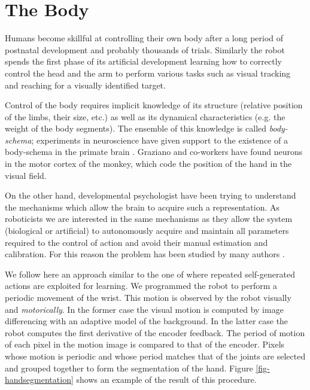 \section{The Body}
\label{sect:body}

Humans become skillful at controlling their own body after a long period of postnatal development and probably thousands of trials. Similarly the robot spends the first phase of its artificial development learning how to correctly control the head and the arm to perform various tasks such as visual tracking and reaching for a visually identified target.

Control of the body requires implicit knowledge of its structure (relative position of the limbs, their size, etc.) as well as its dynamical characteristics (e.g. the weight of the body segments). The ensemble of this knowledge is called \emph{body-schema}; experiments in neuroscience have given support to the existence of a body-schema in the primate brain \cite{graziano99whereis,graziano00coding}. Graziano and co-workers have found neurons in the motor cortex of the monkey, which code the position of the hand in the visual field.

On the other hand, developmental psychologist have been trying to understand the mechanisms which allow the brain to acquire such a representation. As roboticists we are interested in the same mechanisms as they allow the system (biological or artificial) to autonomously acquire and maintain all parameters required to the control of action and avoid their manual estimation and calibration. For this reason the problem has been studied by many authors \cite{yoshikawa03doestheinvariance,fitzpatrick04feelthebeat,metta03early}.

We follow here an approach similar to the one of \cite{fitzpatrick04feelthebeat,metta03early} where repeated self-generated actions are exploited for learning. We programmed the robot to perform a periodic movement of the wrist. This motion is observed by the robot visually and \emph{motorically}. In the former case the visual motion is computed by image differencing with an adaptive model of the background. In the latter case the robot computes the first derivative of the encoder feedback. The period of motion of each pixel in the motion image is compared to that of the encoder. Pixels whose motion is periodic and whose period matches that of the joints are selected and grouped together to form the segmentation of the hand. Figure \ref{fig-handsegmentation} shows an example of the result of this procedure.

